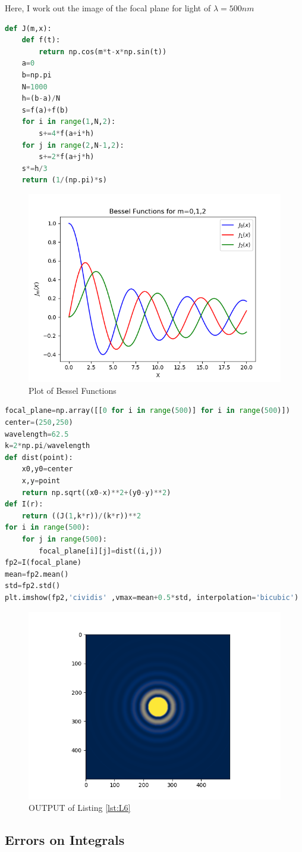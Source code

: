 Here, I work out the image of the focal plane for light of $\lambda=500 nm$
\begin{lstlisting}[language=Python, caption=Bessel Function, frame=single, label={lst:L5} ]
def J(m,x):
	def f(t):
		return np.cos(m*t-x*np.sin(t))
	a=0
	b=np.pi
	N=1000
	h=(b-a)/N
	s=f(a)+f(b)
	for i in range(1,N,2):
		s+=4*f(a+i*h)
	for j in range(2,N-1,2):
		s+=2*f(a+j*h)
	s*=h/3
	return (1/(np.pi)*s)
\end{lstlisting}
\begin{figure}[H]
	\centering
	\includegraphics[width=0.7\linewidth]{BesselFunction}
	\caption{Plot of Bessel Functions}
	\label{fig:besselfunction}
\end{figure}

\begin{lstlisting}[language=Python, caption=Main Function, frame=single, label={lst:L6} ]
focal_plane=np.array([[0 for i in range(500)] for i in range(500)])
center=(250,250)
wavelength=62.5
k=2*np.pi/wavelength
def dist(point):
	x0,y0=center
	x,y=point
	return np.sqrt((x0-x)**2+(y0-y)**2)  
def I(r):
	return ((J(1,k*r))/(k*r))**2
for i in range(500):
	for j in range(500):
		focal_plane[i][j]=dist((i,j))
fp2=I(focal_plane)
mean=fp2.mean()
std=fp2.std()
plt.imshow(fp2,'cividis' ,vmax=mean+0.5*std, interpolation='bicubic')
\end{lstlisting}
\newpage
\begin{figure}[H]
	\centering
	\includegraphics[width=0.7\linewidth]{DiffractionPattern}
	\caption{OUTPUT of Listing \ref{lst:L6}}
	\label{fig:diffractionpattern}
\end{figure}
\subsection{Errors on Integrals}



